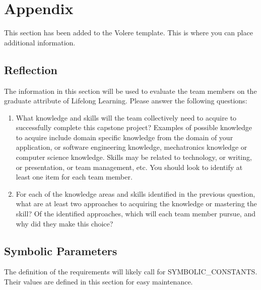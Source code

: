 \documentclass[12pt]{article}
\begin{document}
\noindent {}
\section{Appendix}

This section has been added to the Volere template. This is where you can place additional
information.

\newpage{}
\subsection{Reflection}

The information in this section will be used to evaluate the team members on the graduate attribute
of Lifelong Learning. Please answer the following questions:

\begin{enumerate}
	\item What knowledge and skills will the team collectively need to acquire to successfully complete this
	      capstone project? Examples of possible knowledge to acquire include domain specific knowledge from
	      the domain of your application, or software engineering knowledge, mechatronics knowledge or
	      computer science knowledge. Skills may be related to technology, or writing, or presentation, or
	      team management, etc. You should look to identify at least one item for each team member.
	\item For each of the knowledge areas and skills identified in the previous question, what are at least
	      two approaches to acquiring the knowledge or mastering the skill? Of the identified approaches,
	      which will each team member pursue, and why did they make this choice?
\end{enumerate}

\subsection{Symbolic Parameters}

The definition of the requirements will likely call for SYMBOLIC\_CONSTANTS. Their values are
defined in this section for easy maintenance.
\end{document}
